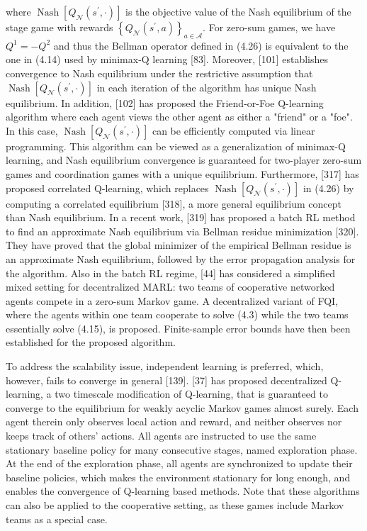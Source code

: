 \documentclass[10pt]{article}
\begin{document}
where $\operatorname{Nash}\left[Q_{\mathcal{N}}\left(s^{\prime}, \cdot\right)\right]$ is the objective value of the Nash equilibrium of the stage game with rewards $\left\{Q_{\mathcal{N}}\left(s^{\prime}, a\right)\right\}_{a \in \mathcal{A}}$. For zero-sum games, we have $Q^{1}=-Q^{2}$ and thus the Bellman operator defined in (4.26) is equivalent to the one in (4.14) used by minimax-Q learning [83]. Moreover, [101] establishes convergence to Nash equilibrium under the restrictive assumption that $\operatorname{Nash}\left[Q_{\mathcal{N}}\left(s^{\prime}, \cdot\right)\right]$ in each iteration of the algorithm has unique Nash equilibrium. In addition, [102] has proposed the Friend-or-Foe Q-learning algorithm where each agent views the other agent as either a "friend" or a "foe". In this case, $\operatorname{Nash}\left[Q_{\mathcal{N}}\left(s^{\prime}, \cdot\right)\right]$ can be efficiently computed via linear programming. This algorithm can be viewed as a generalization of minimax-Q learning, and Nash equilibrium convergence is guaranteed for two-player zero-sum games and coordination games with a unique equilibrium. Furthermore, [317] has proposed correlated Q-learning, which replaces $\operatorname{Nash}\left[Q_{\mathcal{N}}\left(s^{\prime}, \cdot\right)\right]$ in (4.26) by computing a correlated equilibrium [318], a more general equilibrium concept than Nash equilibrium. In a recent work, [319] has proposed a batch RL method to find an approximate Nash equilibrium via Bellman residue minimization [320]. They have proved that the global minimizer of the empirical Bellman residue is an approximate Nash equilibrium, followed by the error propagation analysis for the algorithm. Also in the batch RL regime, [44] has considered a simplified mixed setting for decentralized MARL: two teams of cooperative networked agents compete in a zero-sum Markov game. A decentralized variant of FQI, where the agents within one team cooperate to solve (4.3) while the two teams essentially solve (4.15), is proposed. Finite-sample error bounds have then been established for the proposed algorithm.

To address the scalability issue, independent learning is preferred, which, however, fails to converge in general [139]. [37] has proposed decentralized Q-learning, a two timescale modification of Q-learning, that is guaranteed to converge to the equilibrium for weakly acyclic Markov games almost surely. Each agent therein only observes local action and reward, and neither observes nor keeps track of others' actions. All agents are instructed to use the same stationary baseline policy for many consecutive stages, named exploration phase. At the end of the exploration phase, all agents are synchronized to update their baseline policies, which makes the environment stationary for long enough, and enables the convergence of Q-learning based methods. Note that these algorithms can also be applied to the cooperative setting, as these games include Markov teams as a special case.
\end{document}
